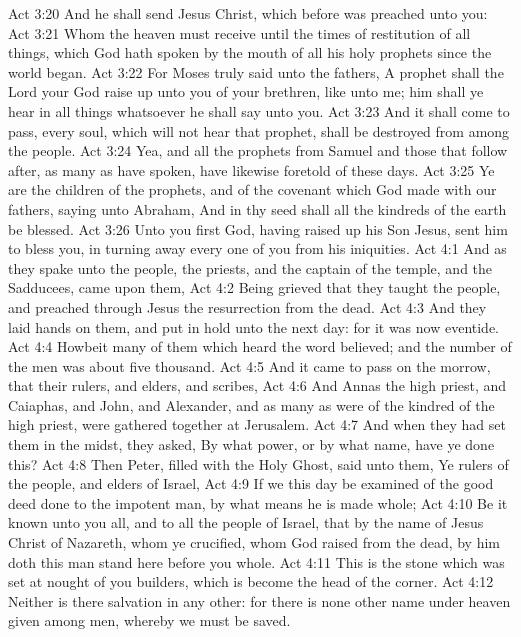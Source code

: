 \vs Act 3:20 And he shall send Jesus Christ, which before was preached unto you:
\vs Act 3:21 Whom the heaven must receive until the times of restitution of all things, which God hath spoken by the mouth of all his holy prophets since the world began.
\vs Act 3:22 For Moses truly said unto the fathers, A prophet shall the Lord your God raise up unto you of your brethren, like unto me; him shall ye hear in all things whatsoever he shall say unto you.
\vs Act 3:23 And it shall come to pass,  every soul, which will not hear that prophet, shall be destroyed from among the people.
\vs Act 3:24 Yea, and all the prophets from Samuel and those that follow after, as many as have spoken, have likewise foretold of these days.
\vs Act 3:25 Ye are the children of the prophets, and of the covenant which God made with our fathers, saying unto Abraham, And in thy seed shall all the kindreds of the earth be blessed.
\vs Act 3:26 Unto you first God, having raised up his Son Jesus, sent him to bless you, in turning away every one of you from his iniquities.
\vs Act 4:1 And as they spake unto the people, the priests, and the captain of the temple, and the Sadducees, came upon them,
\vs Act 4:2 Being grieved that they taught the people, and preached through Jesus the resurrection from the dead.
\vs Act 4:3 And they laid hands on them, and put  in hold unto the next day: for it was now eventide.
\vs Act 4:4 Howbeit many of them which heard the word believed; and the number of the men was about five thousand.
\vs Act 4:5 And it came to pass on the morrow, that their rulers, and elders, and scribes,
\vs Act 4:6 And Annas the high priest, and Caiaphas, and John, and Alexander, and as many as were of the kindred of the high priest, were gathered together at Jerusalem.
\vs Act 4:7 And when they had set them in the midst, they asked, By what power, or by what name, have ye done this?
\vs Act 4:8 Then Peter, filled with the Holy Ghost, said unto them, Ye rulers of the people, and elders of Israel,
\vs Act 4:9 If we this day be examined of the good deed done to the impotent man, by what means he is made whole;
\vs Act 4:10 Be it known unto you all, and to all the people of Israel, that by the name of Jesus Christ of Nazareth, whom ye crucified, whom God raised from the dead,  by him doth this man stand here before you whole.
\vs Act 4:11 This is the stone which was set at nought of you builders, which is become the head of the corner.
\vs Act 4:12 Neither is there salvation in any other: for there is none other name under heaven given among men, whereby we must be saved.
